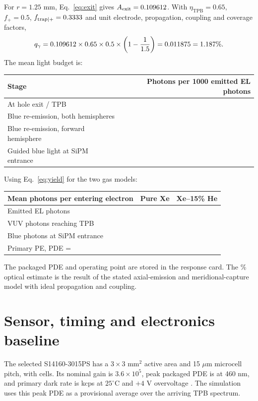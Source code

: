 \documentclass[11pt,a4paper]{article}
\newcommand{\num}[2][3]{\pgfmathprintnumber[fixed,precision=#1,fixed zerofill]{#2}}
\begin{document}
For $r=1.25$ mm, Eq.~\eqref{eq:exit} gives
$A_{\mathrm{exit}}=\num[6]{\elmAcceptance}$.
With $\eta_{\mathrm{TPB}}=0.65$, $f_+=0.5$,
$f_{\mathrm{trap}|+}=\num[4]{\elmCapture}$ and unit electrode, propagation,
coupling and coverage factors,
\begin{equation}
 q_\gamma=\num[6]{\elmAcceptance}\times0.65\times0.5\times
 \left(1-\frac{1}{1.5}\right)
 =\num[6]{\elmOpticalFraction}
 =\num[3]{\elmOpticalPercent}\%.
\end{equation}
The mean light budget is:
\begin{center}
\begin{tabular}{lr}
\toprule Stage & Photons per 1000 emitted EL photons\\\midrule
At hole exit / TPB & \num[2]{\elmVUVExitPerThousand}\\
Blue re-emission, both hemispheres & \num[2]{\elmBlueTotalPerThousand}\\
Blue re-emission, forward hemisphere & \num[2]{\elmBlueForwardPerThousand}\\
Guided blue light at SiPM entrance & \num[2]{\elmBlueSiPMPerThousand}\\\bottomrule
\end{tabular}
\end{center}
Using Eq.~\eqref{eq:yield} for the two gas models:
\begin{center}
\begin{tabular}{lrr}
\toprule Mean photons per entering electron & Pure Xe & Xe--15\% He\\\midrule
Emitted EL photons & \num[2]{\elmXeYield} & \num[2]{\elmHeYield}\\
VUV photons reaching TPB & \num[2]{\elmXeExitPhotons} & \num[2]{\elmHeExitPhotons}\\
Blue photons at SiPM entrance & \num[2]{\elmXeSiPMPhotons} & \num[2]{\elmHeSiPMPhotons}\\
Primary PE, PDE = \num[2]{\elmPDE} & \num[2]{\elmXePrimaryPE} & \num[2]{\elmHePrimaryPE}\\\bottomrule
\end{tabular}
\end{center}
The packaged PDE and operating point are stored in the response card.
The \num[3]{\elmOpticalPercent}\% optical estimate is the result of the stated axial-emission and
meridional-capture model with ideal propagation and coupling.

\section{Sensor, timing and electronics baseline}
The selected S14160-3015PS has a $3\times3$ mm$^2$ active area and 15 $\mu$m
microcell pitch, with \num[0]{\elmMicrocells} cells. Its nominal gain is
$3.6\times10^5$, peak packaged PDE is \num[2]{\elmPDE} at 460 nm, and primary
dark rate is \num[0]{\elmDarkRateKCPS} kcps at $25^\circ$C and $+4$ V overvoltage
\cite{HamamatsuS14160SmallCells}. The simulation uses this peak PDE as a
provisional average over the arriving TPB spectrum.
\end{document}

